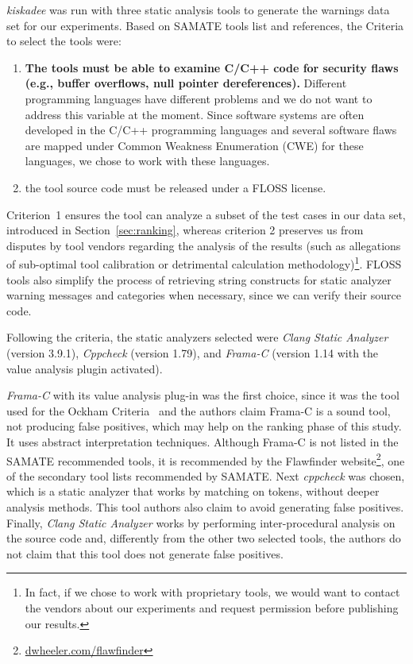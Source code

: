 \textit{kiskadee} was run with three static analysis tools to generate the
warnings data set for our experiments. Based on SAMATE tools list and
references, the Criteria to select the tools were:
\begin{enumerate}
  \item \textbf{The tools must be able to examine C/C++ code for security flaws (e.g., buffer overflows, null pointer dereferences).} Different programming languages have different problems and we do not want to address this variable at the moment. Since software systems are often developed in the C/C++ programming languages and several software flaws are mapped under Common Weakness Enumeration (CWE) for these languages, we chose to work with these languages.
  \item the tool source code must be released under a FLOSS license.
\end{enumerate}
Criterion~1 ensures the tool can analyze a subset of the test cases in our data
set, introduced in Section~\ref{sec:ranking}, whereas criterion 2 preserves us
from disputes by tool vendors regarding the analysis of the results (such as
allegations of sub-optimal tool calibration or detrimental calculation
methodology)\footnote{In fact, if we chose
to work with
proprietary tools, we would want to contact the vendors about our experiments
and request permission before publishing our results.}. FLOSS tools also simplify the process of retrieving string
constructs for static analyzer warning messages and categories when necessary,
since we can verify their source code.

Following the criteria, the static
analyzers selected were \emph{Clang Static Analyzer} (version 3.9.1),
\emph{Cppcheck} (version 1.79), and \emph{Frama-C} (version 1.14 with the value
analysis plugin activated).

\textit{Frama-C} with its value analysis plug-in was the first choice, since it
was the tool used for the Ockham Criteria~\cite{black_sate_2016} and the
authors claim Frama-C is a sound tool, not producing false positives, which may
help on the ranking phase of this study. It uses abstract interpretation
techniques. Although Frama-C is not listed in the SAMATE recommended tools, it
is recommended by the Flawfinder
website\footnote{\url{dwheeler.com/flawfinder}}, one of the secondary tool
lists recommended by SAMATE. Next \textit{cppcheck} was chosen, which is a
static analyzer that works by matching on tokens, without deeper analysis
methods. This tool authors also claim to avoid generating false positives.
Finally, \textit{Clang Static Analyzer} works by performing inter-procedural
analysis on the source code and, differently from the other two selected tools,
the authors do not claim that this tool does not generate false positives.

